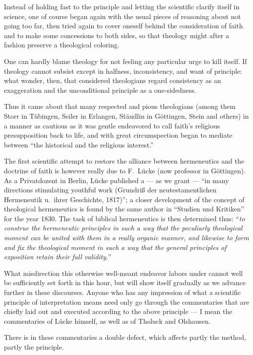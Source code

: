 \documentclass[12pt,a4paper]{book}
\begin{document}
Instead of holding fast to the principle and letting the scientific clarify itself in
science, one of course began again with the usual pieces of reasoning about not going
too far, then tried again to cover oneself behind the consideration of faith and to
make some concessions to both sides, so that theology might after a fashion preserve
a theological coloring.

One can hardly blame theology for not feeling any particular urge to kill itself. If
theology cannot subsist except in halfness, inconsistency, and want of principle:
what wonder, then, that considered theologians regard consistency as an exaggeration
and the unconditional principle as a one-sidedness.

Thus it came about that many respected and pious theologians (among them Storr in
Tübingen, Seiler in Erlangen, Stäudlin in Göttingen, Stein and others) in a manner as
cautious as it was gentle endeavored to call faith's religious presupposition back to
life, and with great circumspection began to mediate between ``the historical and the
religious interest.''

The first scientific attempt to restore the alliance between hermeneutics and the
doctrine of faith is however really due to F.\ Lücke (now professor in Göttingen). As
a Privatdozent in Berlin, Lücke published a --- as we grant --- ``in many directions
stimulating youthful work (Grundriß der neutestamentlichen Hermeneutik u.\ ihrer
Geschichte, 1817)''; a closer development of the concept of theological hermeneutics
is found by the same author in ``Studien und Kritiken'' for the year 1830. The task
of biblical hermeneutics is then determined thus: ``\emph{to construe the hermeneutic
principles in such a way that the peculiarly theological moment can be united with
them in a really organic manner, and likewise to form and fix
the theological moment in such a way that the general principles of exposition retain
their full validity.}''

What misdirection this otherwise well-meant endeavor labors under cannot well be
sufficiently set forth in this hour, but will show itself gradually as we advance
further in these discourses. Anyone who has any impression of what a scientific
principle of interpretation means need only go through the commentaries that are
chiefly laid out and executed according to the above principle --- I mean the
commentaries of Lücke himself, as well as of Tholuck and Olshausen.

There is in these commentaries a double defect, which affects partly the method,
partly the principle.
\end{document}
